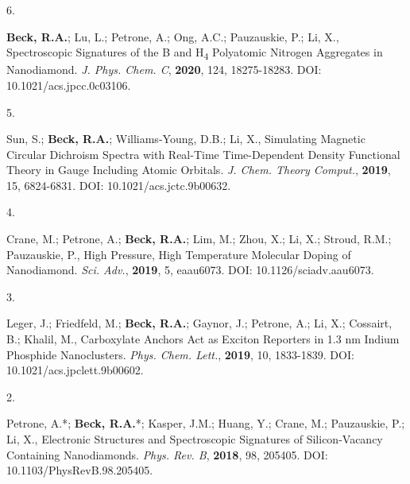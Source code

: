 \begin{cvpublications}



\cvpublication
{6.}
{\parbox[t]{0.95\textwidth}{\strut \textbf{Beck, R.A.}; Lu, L.; Petrone, A.; Ong, A.C.; Pauzauskie, P.; Li, X., 
Spectroscopic Signatures of the B and H\textsubscript{4} Polyatomic Nitrogen Aggregates in Nanodiamond.
\textit{J. Phys. Chem. C}, \textbf{2020}, 124, 18275-18283.
DOI: 10.1021/acs.jpcc.0c03106.}}




\cvpublication
{5.}
{\parbox[t]{0.95\textwidth}{\strut Sun, S.; \textbf{Beck, R.A.}; Williams-Young, D.B.; Li, X.,
Simulating Magnetic Circular Dichroism Spectra with Real-Time Time-Dependent Density Functional Theory in Gauge Including Atomic Orbitals.
\textit{J. Chem. Theory Comput.}, \textbf{2019}, 15, 6824-6831.
DOI: 10.1021/acs.jctc.9b00632.}}




\cvpublication
{4.}
{\parbox[t]{0.95\textwidth}{\strut Crane, M.; Petrone, A.; \textbf{Beck, R.A.}; Lim, M.; Zhou, X.; Li, X.; Stroud, R.M.; Pauzauskie, P.,
High Pressure, High Temperature Molecular Doping of Nanodiamond.
\textit{Sci. Adv.}, \textbf{2019}, 5, eaau6073.
DOI: 10.1126/sciadv.aau6073.}}




\cvpublication
{3.}
{\parbox[t]{0.95\textwidth}{\strut Leger, J.; Friedfeld, M.; \textbf{Beck, R.A.}; Gaynor, J.; Petrone, A.; Li, X.; Cossairt, B.; Khalil, M., 
Carboxylate Anchors Act as Exciton Reporters in 1.3 nm Indium Phosphide Nanoclusters.
\textit{Phys. Chem. Lett.}, \textbf{2019}, 10, 1833-1839.
DOI: 10.1021/acs.jpclett.9b00602.}}




\cvpublication
{2.}
{\parbox[t]{0.95\textwidth}{\strut Petrone, A.*; \textbf{Beck, R.A.}*; Kasper, J.M.; Huang, Y.; Crane, M.; Pauzauskie, P.; Li, X., 
Electronic Structures and Spectroscopic Signatures of Silicon-Vacancy Containing Nanodiamonds.
\textit{Phys. Rev. B}, \textbf{2018}, 98, 205405.
DOI: 10.1103/PhysRevB.98.205405.}}


\end{cvpublications}
